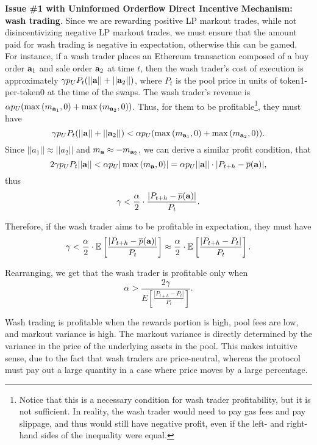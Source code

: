     \textbf{Issue \#1 with Uninformed Orderflow Direct Incentive Mechanism: wash trading}.
    Since we are rewarding positive LP markout trades, while not disincentivizing negative LP markout trades, we must ensure that the amount paid for wash trading is negative in expectation, otherwise this can be gamed. For instance, if a wash trader places an Ethereum transaction composed of a buy order $\textbf a_1$ and sale order $\textbf a_2$ at time $t$, then the wash trader's cost of execution is approximately $\gamma p_U P_t(||\textbf a|| + ||\textbf a_2||)$, where $P_t$ is the pool price in units of token1-per-token0 at the time of the swaps. The wash trader's revenue is $\alpha p_U ( \max{(m_{\textbf a_1}, 0)} + \max{(m_{\textbf a_2}, 0)} )$. Thus, for them to be profitable\footnote{Notice that this is a necessary condition for wash trader profitability, but it is not sufficient. In reality, the wash trader would need to pay gas fees and pay slippage, and thus would still have negative profit, even if the left- and right-hand sides of the inequality were equal.}, they must have $$\gamma p_U P_t(||\textbf a|| + ||\textbf a_2||) < \alpha p_U ( \max{(m_{\textbf a_1}, 0)} + \max{(m_{\textbf a_2}, 0)} ).$$
    Since $||a_1|| \approx ||a_2||$ and $m_{\textbf a} \approx - m_{\textbf a_2}$, we can derive a similar profit condition, that $$2\gamma p_U P_t||\textbf a|| < \alpha p_U |\max{(m_{\textbf a}, 0)}| = \alpha p_U ||\textbf a|| \cdot |P_{t+h} - \overline p(\textbf a)|,$$ thus
    $$\gamma < \frac{\alpha}{2} \cdot \frac{|P_{t+h} - \overline p(\textbf a)|}{P_t}.$$

    Therefore, if the wash trader aims to be profitable in expectation, they must have
        $$\gamma < \frac{\alpha}{2} \cdot \mathbb E \left[ \frac{|P_{t+h} - \overline p(\textbf a)|}{P_t} \right] \approx \frac{\alpha}{2} \cdot \mathbb E \left[ \frac{|P_{t+h} - P_t|}{P_t} \right].$$

    Rearranging, we get that the wash trader is profitable only when 
        $$\alpha > \frac{2\gamma }{E \left[ \frac{|P_{t+h} - P_t|}{P_t} \right]}.$$

    Wash trading is profitable when the rewards portion is high, pool fees are low, and markout variance is high. The markout variance is directly determined by the variance in the price of the underlying assets in the pool. This makes intuitive sense, due to the fact that wash traders are price-neutral, whereas the protocol must pay out a large quantity in a case where price moves by a large percentage.
    
